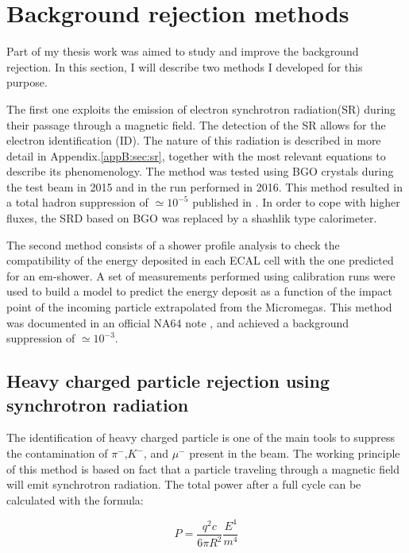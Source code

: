 \section{Background rejection methods}

Part of my thesis work was aimed to study and improve the background rejection. In this section, I will describe two methods I developed for this purpose.

The first one exploits the emission of electron synchrotron radiation(SR) during their passage through a magnetic field. The detection of the SR allows for the electron identification (ID). The nature of this radiation is described in more detail in Appendix.\ref{appB:sec:sr}, together with the most relevant equations to describe its phenomenology. The method was tested using BGO crystals during the test beam in 2015 and in the run performed in 2016. This method resulted in a total hadron suppression of $\simeq 10^{-5}$ published in \cite{Depero:2017mrr}. In order to cope with higher fluxes, the SRD based on BGO was replaced by a shashlik type calorimeter.

The second method consists of a shower profile analysis to check the compatibility of the energy deposited in each ECAL cell with the one predicted for an em-shower. A set of measurements performed using calibration runs were used to build a model to predict the energy deposit as a function of the impact point of the incoming particle extrapolated from the Micromegas.  This method was documented in an official NA64 note \cite{na64-shower-profile}, and achieved a background suppression of $\simeq 10^{-3}$.

\subsection{Heavy charged particle rejection using synchrotron radiation}
\label{ch3:sec:bkg-srd}

The identification of heavy charged particle is one of the main tools to suppress the contamination of $\pi^-$,$K^-$, and $\mu^-$ present in the beam. The working principle of this method is based on fact that a particle traveling through a magnetic field will emit synchrotron radiation. The total power after a full cycle can be calculated with the formula:

\begin{equation}
  \label{eq:srd-power}
  P = \frac{q^2 c}{6 \pi R^2}\frac{E^4}{m^4}
\end{equation}

